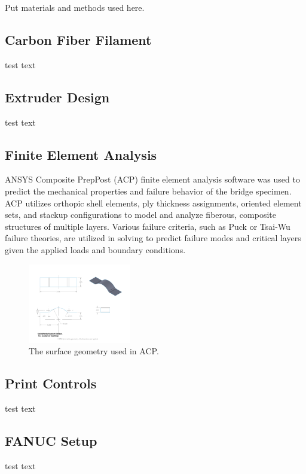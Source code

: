 

Put materials and methods used here.

\subsection*{Carbon Fiber Filament}

test text\\

\subsection*{Extruder Design}

test text\\

\subsection*{Finite Element Analysis}

ANSYS Composite PrepPost (ACP) finite element analysis software was used to predict the mechanical properties and failure behavior of the bridge specimen. ACP utilizes orthopic shell elements, ply thickness assignments, oriented element sets, and stackup configurations to model and analyze fiberous, composite structures of multiple layers. Various failure criteria, such as Puck or Tsai-Wu failure theories, are utilized in solving to predict failure modes and critical layers given the applied loads and boundary conditions.

\begin{figure}[htp]
\includegraphics[width=0.4\textwidth]{./figures/fea/fea-surface-geometry}
\caption{The surface geometry used in ACP.}
\label{fig:fea-bridge-speciment}
\end{figure}


\subsection*{Print Controls}

test text\\

\subsection*{FANUC Setup}

test text\\